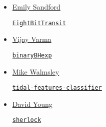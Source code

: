 \documentclass[11pt,a4paper]{article}
\begin{document}
\begin{itemize}
\item \href{https://github.com/esandford}{Emily Sandford}
  \begin{itemize}
    \href{https://github.com/esandford/EightBitTransit}{\tt EightBitTransit}
  \end{itemize}

\item \href{https://github.com/vijayvarma392}{Vijay Varma}
  \begin{itemize}
    \href{https://github.com/vijayvarma392/binaryBHexp}{\tt binaryBHexp}
  \end{itemize}

\item \href{https://github.com/mwalmsley/}{Mike Walmsley} 
  \begin{itemize}
    \href{https://github.com/mwalmsley/tidal-features-classifier}{\tt tidal-features-classifier} 
\end{itemize}


\item \href{https://github.com/thespacedoctor}{David Young}
  \begin{itemize}
    \href{https://github.com/thespacedoctor/sherlock}{{\tt sherlock}}
  \end{itemize}




\end{itemize}
\end{document}
